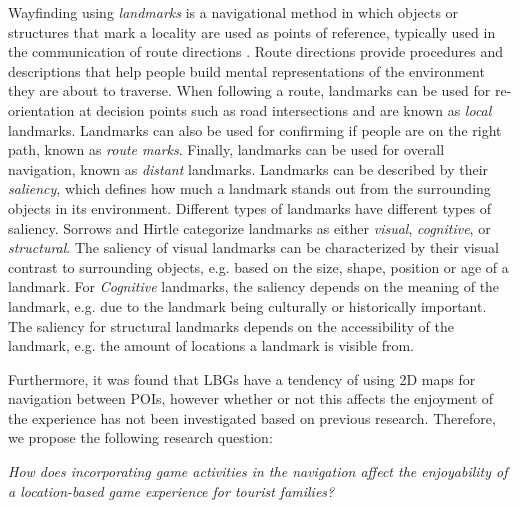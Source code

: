 Wayfinding using \textit{landmarks} is a navigational method in which objects or structures that mark a locality are used as points of reference, typically used in the communication of route directions \cite{landmarks}. Route directions provide procedures and descriptions that help people build mental representations of the environment they are about to traverse. When following a route, landmarks can be used for re-orientation at decision points such as road intersections and are known as \textit{local} landmarks. Landmarks can also be used for confirming if people are on the right path, known as \textit{route marks}. Finally, landmarks can be used for overall navigation, known as \textit{distant} landmarks. Landmarks can be described by their \textit{saliency}, which defines how much a landmark stands out from the surrounding objects in its environment. Different types of landmarks have different types of saliency. Sorrows and Hirtle categorize landmarks as either \textit{visual}, \textit{cognitive}, or \textit{structural}\cite{landmarksChar}. The saliency of visual landmarks can be characterized by their visual contrast to surrounding objects, e.g. based on the size, shape, position or age of a landmark. For \textit{Cognitive} landmarks, the saliency depends on the meaning of the landmark, e.g. due to the landmark being culturally or historically important. The saliency for structural landmarks depends on the accessibility of the landmark, e.g. the amount of locations a landmark is visible from.  

Furthermore, it was found that LBGs have a tendency of using 2D maps for navigation between POIs, however whether or not this affects the enjoyment of the experience has not been investigated based on previous research. Therefore, we propose the following research question:

\emph{How does incorporating game activities in the navigation affect the enjoyability of a location-based game experience for tourist families?}


